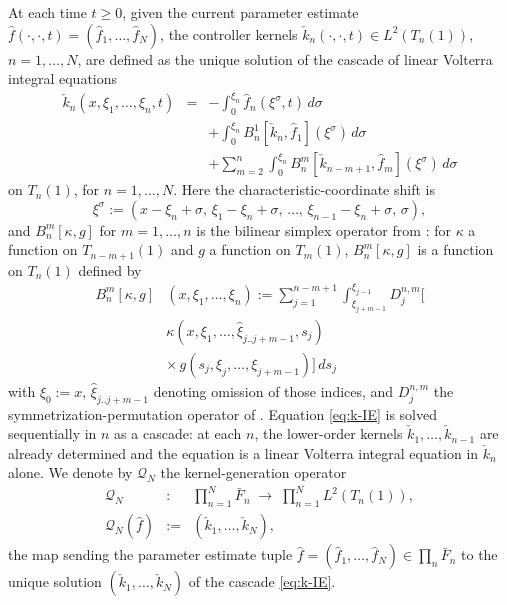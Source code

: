 \documentclass[journal,twoside,web]{ieeecolor}
\begin{document}
At each time $t\ge 0$, given the current parameter estimate $\hat f(\cdot,\cdot,t)=(\hat f_1,\ldots,\hat f_N)$, the controller kernels $\check k_n(\cdot,\cdot,t)\in L^2(T_n(1))$, $n=1,\ldots,N$, are defined as the unique solution of the cascade of linear Volterra integral equations
\begin{eqnarray}
\check k_n(x,\xi_1,\ldots,\xi_n,t) &=& -\int_0^{\xi_n}\hat f_n(\xi^\sigma,t)\,d\sigma \nonumber\\
&& +\int_0^{\xi_n}\!B^1_n[\check k_n,\hat f_1](\xi^\sigma)\,d\sigma \nonumber\\
&& +\sum_{m=2}^n\int_0^{\xi_n}\!B^m_n[\check k_{n-m+1},\hat f_m](\xi^\sigma)\,d\sigma \label{eq:k-IE}
\end{eqnarray}
on $T_n(1)$, for $n=1,\ldots,N$.
Here the characteristic-coordinate shift is
\begin{equation}\label{eq:xi-sigma}
\xi^\sigma:=(x-\xi_n+\sigma,\,\xi_1-\xi_n+\sigma,\,\ldots,\,\xi_{n-1}-\xi_n+\sigma,\,\sigma),
\end{equation}
and $B^m_n[\kappa,g]$ for $m=1,\ldots,n$ is the bilinear simplex operator from \cite[eqs.~(20)--(21)]{HV1}: for $\kappa$ a function on $T_{n-m+1}(1)$ and $g$ a function on $T_m(1)$, $B^m_n[\kappa,g]$ is a function on $T_n(1)$ defined by
\begin{align}
B^m_n[\kappa,g]&(x,\xi_1,\ldots,\xi_n):=\sum_{j=1}^{n-m+1}\int_{\xi_{j+m-1}}^{\xi_{j-1}}\!\!D^{n,m}_j\bigl[ \nonumber\\
&\kappa(x,\xi_1,\ldots,\hat\xi_{j..j+m-1},s_j) \nonumber\\
&\times\,g(s_j,\xi_j,\ldots,\xi_{j+m-1})\bigr]\,ds_j \label{eq:Bmn-def}
\end{align}
with $\xi_0:=x$, $\hat\xi_{j..j+m-1}$ denoting omission of those indices, and $D^{n,m}_j$ the symmetrization-permutation operator of \cite[eq.~(21)]{HV1}.
Equation \eqref{eq:k-IE} is solved sequentially in $n$ as a cascade: at each $n$, the lower-order kernels $\check k_1,\ldots,\check k_{n-1}$ are already determined and the equation is a linear Volterra integral equation in $\check k_n$ alone. We denote by $\mathcal Q_N$ the kernel-generation operator
\begin{eqnarray}
\mathcal Q_N &:& \prod_{n=1}^N \bar F_n\;\longrightarrow\;\prod_{n=1}^N L^2(T_n(1)), \nonumber\\
\mathcal Q_N(\hat f) &:=& (\check k_1,\ldots,\check k_N), \label{eq:QN-def}
\end{eqnarray}
the map sending the parameter estimate tuple $\hat f=(\hat f_1,\ldots,\hat f_N)\in\prod_n \bar F_n$ to the unique solution $(\check k_1,\ldots,\check k_N)$ of the cascade \eqref{eq:k-IE}.
\end{document}
